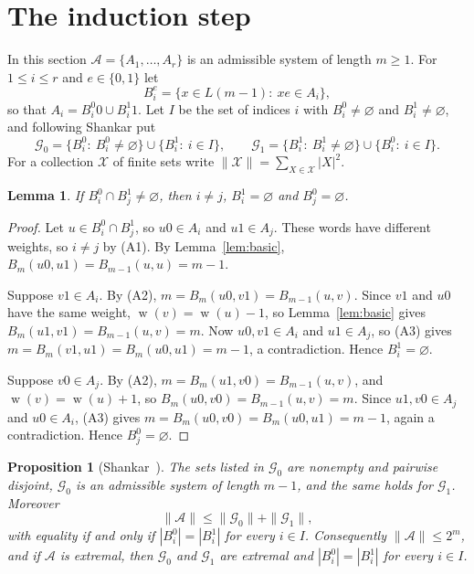 \documentclass[11pt]{amsart}
\newtheorem{proposition}[theorem]{Proposition}
\newtheorem{lemma}[theorem]{Lemma}
\theoremstyle{definition}
\theoremstyle{remark}
\numberwithin{equation}{section}
\newcommand{\cA}{\mathcal{A}}
\newcommand{\cG}{\mathcal{G}}
\DeclareMathOperator{\wt}{w}
\begin{document}
\section{The induction step}\label{sec:induction}

In this section $\cA=\{A_1,\dots,A_r\}$ is an admissible system of length $m\ge1$. For $1\le i\le r$ and $e\in\{0,1\}$ let
\[
B_i^e=\{x\in L(m-1):\ xe\in A_i\},
\]
so that $A_i=B_i^0 0\cup B_i^1 1$. Let $I$ be the set of indices $i$ with $B_i^0\ne\varnothing$ and $B_i^1\ne\varnothing$, and following Shankar put
\[
\cG_0=\{B_i^0:\ B_i^0\ne\varnothing\}\cup\{B_i^1:\ i\in I\},\qquad
\cG_1=\{B_i^1:\ B_i^1\ne\varnothing\}\cup\{B_i^0:\ i\in I\}.
\]
For a collection $\mathcal X$ of finite sets write $\|\mathcal X\|=\sum_{X\in\mathcal X}|X|^2$.

\begin{lemma}\label{lem:disjoint}
If $B_i^0\cap B_j^1\ne\varnothing$, then $i\ne j$, $B_i^1=\varnothing$ and $B_j^0=\varnothing$.
\end{lemma}

\begin{proof}
Let $u\in B_i^0\cap B_j^1$, so $u0\in A_i$ and $u1\in A_j$. These words have different weights, so $i\ne j$ by (A1). By Lemma~\ref{lem:basic}, $B_m(u0,u1)=B_{m-1}(u,u)=m-1$.

Suppose $v1\in A_i$. By (A2), $m=B_m(u0,v1)=B_{m-1}(u,v)$. Since $v1$ and $u0$ have the same weight, $\wt(v)=\wt(u)-1$, so Lemma~\ref{lem:basic} gives $B_m(u1,v1)=B_{m-1}(u,v)=m$. Now $u0,v1\in A_i$ and $u1\in A_j$, so (A3) gives $m=B_m(v1,u1)=B_m(u0,u1)=m-1$, a contradiction. Hence $B_i^1=\varnothing$.

Suppose $v0\in A_j$. By (A2), $m=B_m(u1,v0)=B_{m-1}(u,v)$, and $\wt(v)=\wt(u)+1$, so $B_m(u0,v0)=B_{m-1}(u,v)=m$. Since $u1,v0\in A_j$ and $u0\in A_i$, (A3) gives $m=B_m(u0,v0)=B_m(u0,u1)=m-1$, again a contradiction. Hence $B_j^0=\varnothing$.
\end{proof}

\begin{proposition}[{Shankar~\cite[Lemma~2.3]{Sh}}]\label{prop:inequality}
The sets listed in $\cG_0$ are nonempty and pairwise disjoint, $\cG_0$ is an admissible system of length $m-1$, and the same holds for $\cG_1$. Moreover
\[
\|\cA\|\le\|\cG_0\|+\|\cG_1\| ,
\]
with equality if and only if $|B_i^0|=|B_i^1|$ for every $i\in I$. Consequently $\|\cA\|\le 2^m$, and if $\cA$ is extremal, then $\cG_0$ and $\cG_1$ are extremal and $|B_i^0|=|B_i^1|$ for every $i\in I$.
\end{proposition}
\end{document}
